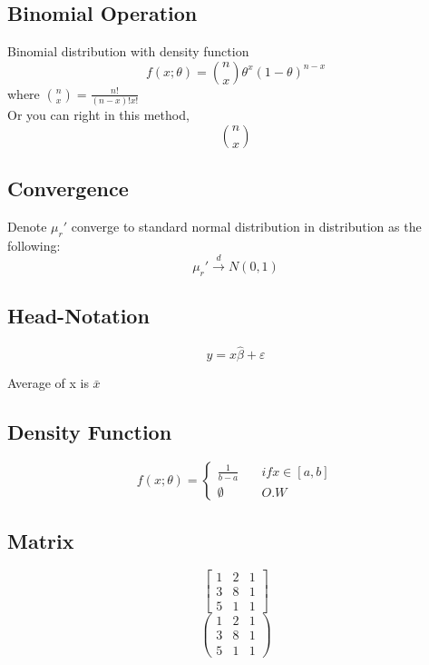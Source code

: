 \documentclass[11pt]{article}
\begin{document}
        \subsection{Binomial Operation}
         Binomial distribution with density function
         $$ f(x;\theta) = \binom{n}{x} \theta^x (1-\theta)^{n-x} $$
         where $\binom{n}{x} = \frac{n!}{(n-x)!x!} $
         $$$$
         Or you can right in this method,
         $${n \choose x}$$


        \subsection{Convergence}
        Denote $\mu_r'$ converge to standard normal distribution in distribution as the following:
        $$\mu_r' \xrightarrow{d} N(0, 1)$$
        
        \subsection{Head-Notation}
        \begin{equation*}
            y = x\hat{\beta} + \varepsilon
        \end{equation*}

        Average of x is $\bar{x}$
        

        \subsection{Density Function}
        $$
        f(x;\theta) = 
        \begin{cases}
            \frac{1}{b-a} \quad &if x\in[a,b]\\
            \emptyset \quad &O.W
        \end{cases}
        $$


        \subsection{Matrix}

        $$\begin{bmatrix}
            1 & 2 & 1 \\
            3 & 8 & 1 \\
            5 & 1 & 1

        \end{bmatrix}$$
        $$$$
        $$\begin{pmatrix}
            1 & 2 & 1 \\
            3 & 8 & 1 \\
            5 & 1 & 1
        \end{pmatrix}$$
\end{document}
